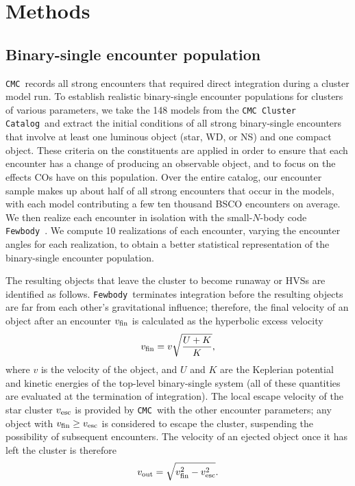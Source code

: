 \documentclass[twocolumn]{aastex631}
\newcommand{\CMC}{\texttt{CMC}}
\newcommand{\CMCcat}{\texttt{CMC Cluster Catalog}}
\newcommand{\fewbody}{\texttt{Fewbody}}
\begin{document}
\section{Methods} \label{sec:methods}

\subsection{Binary-single encounter population} \label{subsec:binsingle_pop}

\CMC\ records all strong encounters that required direct integration during a cluster model run.
To establish realistic binary-single encounter populations for clusters of various parameters, we take the 148 models from the \CMCcat\ and extract the initial conditions of all strong binary-single encounters that involve at least one luminous object (star, WD, or NS) and one compact object.
These criteria on the constituents are applied in order to ensure that each encounter has a change of producing an observable object, and to focus on the effects COs have on this population.
Over the entire catalog, our encounter sample makes up about half of all strong encounters that occur in the models, with each model contributing a few ten thousand BSCO encounters on average.
We then realize each encounter in isolation with the small-$N$-body code \fewbody\ \citep{2004MNRAS.352....1F}.
We compute 10 realizations of each encounter, varying the encounter angles for each realization, to obtain a better statistical representation of the binary-single encounter population.

The resulting objects that leave the cluster to become runaway or HVSs are identified as follows.
\fewbody\ terminates integration before the resulting objects are far from each other's gravitational influence; therefore, the final velocity of an object after an encounter $v_{\rm fin}$ is calculated as the hyperbolic excess velocity
\begin{equation}
    v_{\rm fin} = v \sqrt{\frac{U + K}{K}},
\end{equation}
where $v$ is the velocity of the object, and $U$ and $K$ are the Keplerian potential and kinetic energies of the top-level binary-single system (all of these quantities are evaluated at the termination of integration).
The local escape velocity of the star cluster $v_{\rm esc}$ is provided by \CMC\ with the other encounter parameters; any object with $v_{\rm fin} \ge v_{\rm esc}$ is considered to escape the cluster, suspending the possibility of subsequent encounters.
The velocity of an ejected object once it has left the cluster is therefore
\begin{equation}
    v_{\rm out} = \sqrt{v_{\rm fin}^2 - v_{\rm esc}^2}.
\end{equation}
\end{document}
